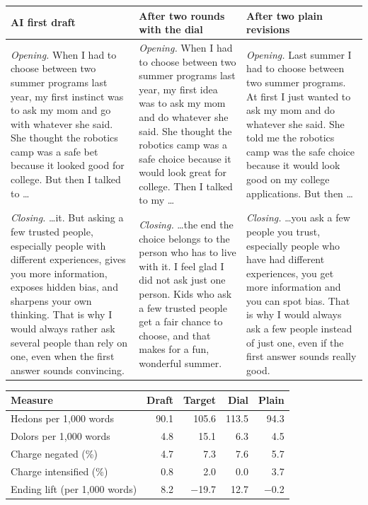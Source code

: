 \begin{tabular}{@{}p{}p{}p{}@{}}
\toprule
AI first draft & After two rounds with the dial & After two plain revisions \\
\midrule
\emph{Opening.} When I had to choose between two summer programs last year, my first instinct was to ask my mom and go with whatever she said. She thought the robotics camp was a safe bet because it looked good for college. But then I talked to \ldots & \emph{Opening.} When I had to choose between two summer programs last year, my first idea was to ask my mom and do whatever she said. She thought the robotics camp was a safe choice because it would look great for college. Then I talked to my \ldots & \emph{Opening.} Last summer I had to choose between two summer programs. At first I just wanted to ask my mom and do whatever she said. She told me the robotics camp was the safe choice because it would look good on my college applications. But then \ldots \\[4pt]
\emph{Closing.} \ldots it. But asking a few trusted people, especially people with different experiences, gives you more information, exposes hidden bias, and sharpens your own thinking. That is why I would always rather ask several people than rely on one, even when the first answer sounds convincing. & \emph{Closing.} \ldots the end the choice belongs to the person who has to live with it. I feel glad I did not ask just one person. Kids who ask a few trusted people get a fair chance to choose, and that makes for a fun, wonderful summer. & \emph{Closing.} \ldots you ask a few people you trust, especially people who have had different experiences, you get more information and you can spot bias. That is why I would always ask a few people instead of just one, even if the first answer sounds really good. \\
\bottomrule
\end{tabular}

\vspace{6pt}
\begin{tabular}{@{}lrrrr@{}}
\toprule
Measure & Draft & Target & Dial & Plain \\
\midrule
Hedons per 1,000 words & 90.1 & 105.6 & 113.5 & 94.3 \\
Dolors per 1,000 words & 4.8 & 15.1 & 6.3 & 4.5 \\
Charge negated (\%) & 4.7 & 7.3 & 7.6 & 5.7 \\
Charge intensified (\%) & 0.8 & 2.0 & 0.0 & 3.7 \\
Ending lift (per 1,000 words) & 8.2 & \ensuremath{-}19.7 & 12.7 & \ensuremath{-}0.2 \\
\bottomrule
\end{tabular}
